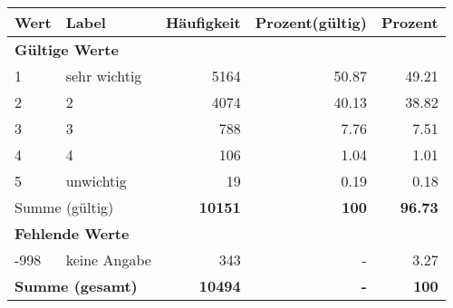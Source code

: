      \begin{longtable}{lXrrr}
     \toprule
     \textbf{Wert} & \textbf{Label} & \textbf{Häufigkeit} & \textbf{Prozent(gültig)} & \textbf{Prozent} \\
     \endhead
     \midrule
     \multicolumn{5}{l}{\textbf{Gültige Werte}}\\

     1 &
     \multicolumn{1}{X}{ sehr wichtig   } &


       \num{5164} &
       \num[round-mode=places,round-precision=2]{50,87} &
         \num[round-mode=places,round-precision=2]{49,21} \\

     2 &
     \multicolumn{1}{X}{ 2   } &


       \num{4074} &
       \num[round-mode=places,round-precision=2]{40,13} &
         \num[round-mode=places,round-precision=2]{38,82} \\

     3 &
     \multicolumn{1}{X}{ 3   } &


       \num{788} &
       \num[round-mode=places,round-precision=2]{7,76} &
         \num[round-mode=places,round-precision=2]{7,51} \\

     4 &
     \multicolumn{1}{X}{ 4   } &


       \num{106} &
       \num[round-mode=places,round-precision=2]{1,04} &
         \num[round-mode=places,round-precision=2]{1,01} \\

     5 &
     \multicolumn{1}{X}{ unwichtig   } &


       \num{19} &
       \num[round-mode=places,round-precision=2]{0,19} &
         \num[round-mode=places,round-precision=2]{0,18} \\
     \midrule
     \multicolumn{2}{l}{Summe (gültig)} &
       \textbf{\num{10151}} &
     \textbf{100} &
       \textbf{\num[round-mode=places,round-precision=2]{96,73}} \\
     \multicolumn{5}{l}{\textbf{Fehlende Werte}}\\
       -998 &
       keine Angabe &
         \num{343} &
        - &
         \num[round-mode=places,round-precision=2]{3,27} \\
     \midrule
     \multicolumn{2}{l}{\textbf{Summe (gesamt)}} &
          \textbf{\num{10494}} &
        \textbf{-} &
        \textbf{100} \\
     \bottomrule
     \end{longtable}
     
